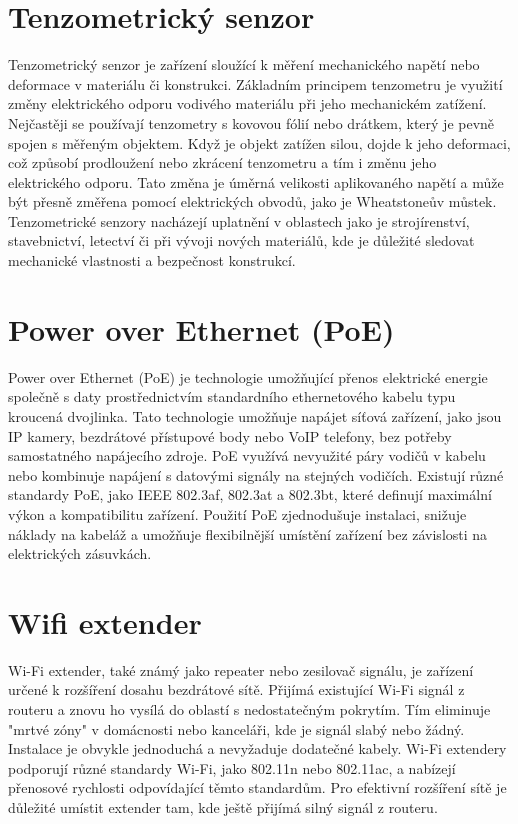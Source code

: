 \section{Tenzometrický senzor}\label{sec:tenzor}
Tenzometrický senzor je zařízení sloužící k měření mechanického napětí nebo deformace v materiálu či konstrukci. Základním principem tenzometru je využití změny elektrického odporu vodivého materiálu při jeho mechanickém zatížení. Nejčastěji se používají tenzometry s kovovou fólií nebo drátkem, který je pevně spojen s měřeným objektem. Když je objekt zatížen silou, dojde k jeho deformaci, což způsobí prodloužení nebo zkrácení tenzometru a tím i změnu jeho elektrického odporu. Tato změna je úměrná velikosti aplikovaného napětí a může být přesně změřena pomocí elektrických obvodů, jako je Wheatstoneův můstek. Tenzometrické senzory nacházejí uplatnění v oblastech jako je strojírenství, stavebnictví, letectví či při vývoji nových materiálů, kde je důležité sledovat mechanické vlastnosti a bezpečnost konstrukcí.

\section{Power over Ethernet (PoE)}\label{sec:poe}
Power over Ethernet (PoE) je technologie umožňující přenos elektrické energie společně s daty prostřednictvím standardního ethernetového kabelu typu kroucená dvojlinka. Tato technologie umožňuje napájet síťová zařízení, jako jsou IP kamery, bezdrátové přístupové body nebo VoIP telefony, bez potřeby samostatného napájecího zdroje. PoE využívá nevyužité páry vodičů v kabelu nebo kombinuje napájení s datovými signály na stejných vodičích. Existují různé standardy PoE, jako IEEE 802.3af, 802.3at a 802.3bt, které definují maximální výkon a kompatibilitu zařízení. Použití PoE zjednodušuje instalaci, snižuje náklady na kabeláž a umožňuje flexibilnější umístění zařízení bez závislosti na elektrických zásuvkách.

\section{Wifi extender}\label{sec:wifi-extender}
Wi-Fi extender, také známý jako repeater nebo zesilovač signálu, je zařízení určené k rozšíření dosahu bezdrátové sítě. Přijímá existující Wi-Fi signál z routeru a znovu ho vysílá do oblastí s nedostatečným pokrytím. Tím eliminuje "mrtvé zóny" v domácnosti nebo kanceláři, kde je signál slabý nebo žádný. Instalace je obvykle jednoduchá a nevyžaduje dodatečné kabely. Wi-Fi extendery podporují různé standardy Wi-Fi, jako 802.11n nebo 802.11ac, a nabízejí přenosové rychlosti odpovídající těmto standardům. Pro efektivní rozšíření sítě je důležité umístit extender tam, kde ještě přijímá silný signál z routeru.

